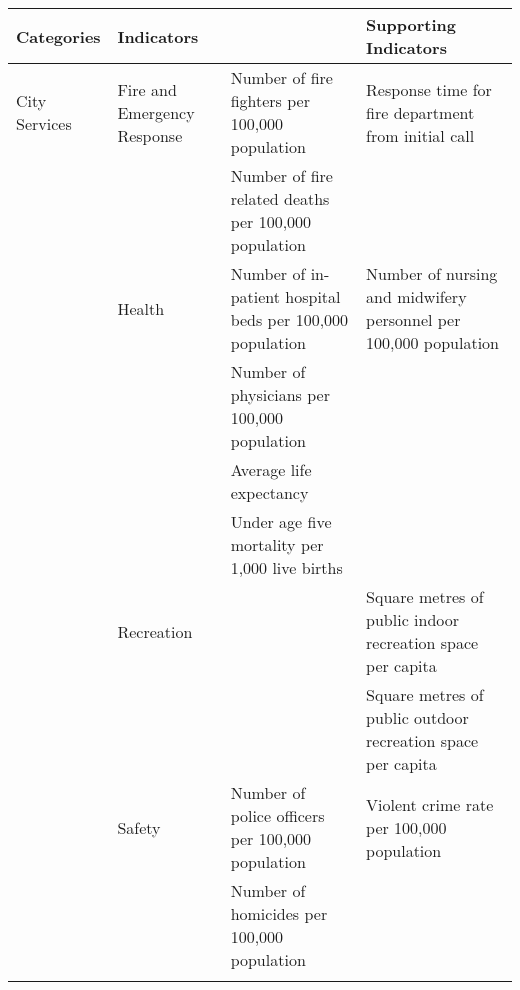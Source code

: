 \begin{landscape}
\begin{table}[th]
\begin{center}
\begin{tabular}{ >{\raggedright\arraybackslash}p{} >{\raggedright\arraybackslash}p{} >{\raggedright\arraybackslash}p{} >{\raggedright\arraybackslash}p{} } 
\hline
Categories & Indicators &  & Supporting Indicators \\
\hline
City Services & Fire and Emergency Response & Number of fire fighters per 100,000 population & Response time for fire department from initial call \\
  &  & Number of fire related deaths per 100,000 population \linebreak &  \\
  & Health & Number of in-patient hospital beds per 100,000 population & Number of nursing and midwifery personnel per 100,000 population \\
  &  & Number of physicians per 100,000 population &  \\
  &  & Average life expectancy &  \\
  &  & Under age five mortality per 1,000 live births \linebreak &  \\
  & Recreation &  & Square metres of public indoor recreation space per capita \\
  &  &  & Square metres of public outdoor recreation space per capita \linebreak \\
  & Safety & Number of police officers per 100,000 population & Violent crime rate per 100,000 population \\
  &  & Number of homicides per 100,000 population &  \\
\hline
\label{tbl:globalCityIndicatorsFacility1}
\end{tabular}
\end{center}
\end{table}


\end{landscape}
